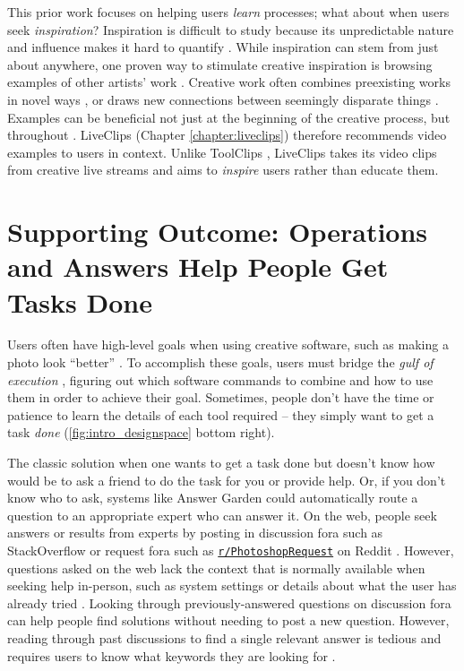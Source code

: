 This prior work focuses on helping users \textit{learn} processes; what about when users seek \textit{inspiration}? Inspiration is difficult to study because its unpredictable nature and influence makes it hard to quantify \cite{Shneiderman2007}.
While inspiration can stem from just about anywhere, one proven way to stimulate creative inspiration is browsing examples of other artists' work \cite{Benjamin2014, Foster2003, Shneiderman2007, Shneiderman2002, Muller-Wienbergen2011, Greene2002, Bawden1986}. Creative work often combines preexisting works in novel ways \cite{Benjamin2014}, or draws new connections between seemingly disparate things \cite{Foster2003}. Examples can be beneficial not just at the beginning of the creative process, but throughout \cite{Kulkarni2014, Siangliulue2015, Rhodes1996}. LiveClips (Chapter \ref{chapter:liveclips}) therefore recommends video examples to users in context. Unlike ToolClips \cite{Grossman2010a}, LiveClips takes its video clips from creative live streams and aims to \textit{inspire} users rather than educate them.

\section{Supporting Outcome: Operations and Answers Help People Get Tasks Done}
Users often have high-level goals when using creative software, such as making a photo look ``better'' \cite{Laput2013}. To accomplish these goals, users must bridge the \textit{gulf of execution} \cite{Hutchins1985}, figuring out which software commands to combine and how to use them in order to achieve their goal. Sometimes, people don't have the time or patience to learn the details of each tool required -- they simply want to get a task \textit{done} \cite{Laput2013, Manuvirakurike2018} (\autoref{fig:intro_designspace} bottom right). 

The classic solution when one wants to get a task done but doesn't know how would be to ask a friend to do the task for you or provide help. Or, if you don't know who to ask, systems like Answer Garden \cite{Ackerman1990} could automatically route a question to an appropriate expert who can answer it. On the web, people seek answers or results from experts by posting in discussion fora such as StackOverflow or request fora such as \href{https://www.reddit.com/r/PhotoshopRequest/}{\nolinkurl{r/PhotoshopRequest}} on Reddit \cite{Manuvirakurike2018}. However, questions asked on the web lack the context that is normally available when seeking help in-person, such as system settings or details about what the user has already tried \cite{Asaduzzaman2013, Chen2017}. Looking through previously-answered questions on discussion fora can help people find solutions without needing to post a new question. However, reading through past discussions to find a single relevant answer is tedious and requires users to know what keywords they are looking for \cite{Chilana2012}. 

